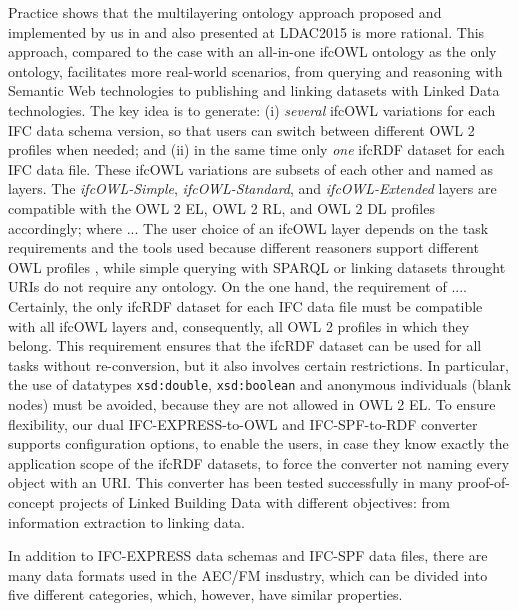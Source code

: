 Practice shows that the multilayering ontology approach proposed and implemented by us in \cite{vu2015implementation} and also presented at LDAC2015 is more rational.
This approach, compared to the case with an all-in-one ifcOWL ontology as the only ontology, facilitates more real-world scenarios, from querying and reasoning with Semantic Web technologies to publishing and linking datasets with Linked Data technologies.
The key idea is to generate:
(i) \emph{several} {ifcOWL} variations for each IFC data schema version, so that users can switch between different OWL 2 profiles when needed;
and (ii) in the same time only \emph{one} {ifcRDF} dataset for each IFC data file.
These {ifcOWL} variations are subsets of each other and named as layers.
The \emph{ifcOWL-Simple}, \emph{ifcOWL-Standard}, and \emph{ifcOWL-Extended} layers are compatible with the OWL 2 EL, OWL 2 RL, and OWL 2 DL profiles accordingly; where ...
The user choice of an ifcOWL layer depends on the task requirements and the tools used because different reasoners support different OWL profiles \cite{w3c2017owlimplementations, manchester2017reasoners}, while simple querying with SPARQL or linking datasets throught URIs do not require any ontology.
On the one hand, the requirement of ....
Certainly, the only ifcRDF dataset for each IFC data file must be compatible with all ifcOWL layers and, consequently, all OWL 2 profiles in which they belong.
This requirement ensures that the ifcRDF dataset can be used for all tasks without re-conversion, but it also involves certain restrictions.
In particular, the use of datatypes \texttt{xsd:double}, \texttt{xsd:boolean} and anonymous individuals (blank nodes) must be avoided, because they are not allowed in OWL 2 EL.
To ensure flexibility, our dual IFC-EXPRESS-to-OWL and IFC-SPF-to-RDF converter supports configuration options, to enable the users, in case they know exactly the application scope of the ifcRDF datasets, to force the converter not naming every object with an URI.
This converter has been tested successfully in many proof-of-concept projects of Linked Building Data with different objectives: from information extraction to linking data.




In addition to IFC-EXPRESS data schemas and IFC-SPF data files, there are many data formats used in the AEC/FM insdustry, which can be divided into five different categories, which, however, have similar properties.


